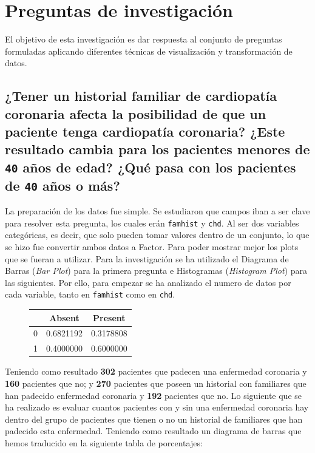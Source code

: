 \documentclass[a4paper, 9pt]{article}
\begin{document}
\section{Preguntas de investigación}
\noindent
El objetivo de esta investigación es dar respuesta al conjunto de preguntas formuladas aplicando diferentes técnicas de visualización y transformación de datos.


\subsection{¿Tener un historial familiar de cardiopatía coronaria afecta la posibilidad de que un paciente tenga cardiopatía coronaria? ¿Este resultado cambia para los pacientes menores de \texttt{40} años de edad? ¿Qué pasa con los pacientes de \texttt{40} años o más?}

\vspace{3mm} 

La preparación de los datos fue simple. Se estudiaron que campos iban a ser clave para resolver esta pregunta, los cuales erán \texttt{famhist} y \texttt{chd}. Al ser dos variables categóricas, es decir, que solo pueden tomar valores dentro de un conjunto, lo que se hizo fue convertir ambos datos a Factor. Para poder mostrar mejor los plots que se fueran a utilizar. Para la investigación se ha utilizado el Diagrama de Barras (\emph{Bar Plot}) para la primera pregunta e Histogramas (\emph{Histogram Plot}) para las siguientes. Por ello, para empezar se ha analizado el numero de datos por cada variable, tanto en \texttt{famhist} como en \texttt{chd}. 

\begin{figure}
    \centering
    \begin{tabular}{|c||c|c|}
        \hline
          & Absent & Present   \\ \hline \hline
        0 & 0.6821192 & 0.3178808 \\ \hline
        1 & 0.4000000 & 0.6000000 \\ \hline
    \end{tabular}
    \label{tabla:question1-porcentagetable}
\end{figure}

Teniendo como resultado \textbf{302} pacientes que padecen una enfermedad coronaria y \textbf{160} pacientes que no; y \textbf{270} pacientes que poseen un historial con familiares que han padecido enfermedad coronaria y \textbf{192} pacientes que no. Lo siguiente que se ha realizado es evaluar cuantos pacientes con y sin una enfermedad coronaria hay dentro del grupo de pacientes que tienen o no un historial de familiares que han padecido esta enfermedad. Teniendo como resultado un diagrama de barras que hemos traducido en la siguiente tabla de porcentajes:
\end{document}

